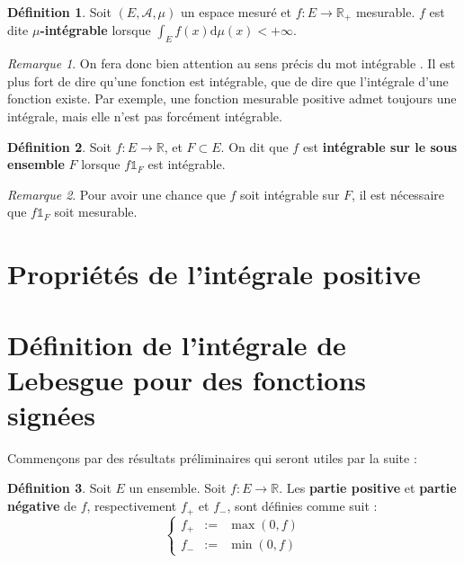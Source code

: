 \documentclass[french]{report}
\theoremstyle{plain}
\theoremstyle{definition}
\newtheorem{defi}{Définition}[section]
\theoremstyle{remark}
\newtheorem{rem}{Remarque}[section]
\begin{document}
\begin{defi}
  Soit $\left(E,\mathcal{A},\mu\right)$ un espace mesuré et $f:E\rightarrow\mathbb{R}_+$ mesurable.
  $f$ est dite $\mu$\textbf{-intégrable} lorsque $\displaystyle\int_Ef(x)\text{d}\mu(x) < +\infty$.
\end{defi}

\begin{rem}
  \label{rem:attint}
  On fera donc bien attention au sens précis du mot \og intégrable \fg.
  Il est plus fort de dire qu'une fonction est intégrable, que de dire que l'intégrale d'une fonction existe.
  Par exemple, une fonction mesurable positive admet toujours une intégrale, mais elle n'est pas forcément intégrable.
\end{rem}

\begin{defi}
  Soit $f:E\longrightarrow\mathbb{R}$, et $F\subset E$.
  On dit que $f$ est \textbf{intégrable sur le sous ensemble} $F$ lorsque $f\mathds{1}_F$ est intégrable.
\end{defi}

\begin{rem}
  Pour avoir une chance que $f$ soit intégrable sur $F$, il est nécessaire que $f\mathds{1}_F$ soit mesurable.
\end{rem}


\section{Propriétés de l'intégrale positive}

\section{Définition de l'intégrale de Lebesgue pour des fonctions signées}

Commençons par des résultats préliminaires qui seront utiles par la suite :

\begin{defi}
  \label{def:partieposneg}
  Soit $E$ un ensemble.
  Soit $f:E\longrightarrow\mathbb{R}$.
  Les \textbf{partie positive} et \textbf{partie négative} de $f$, respectivement $f_+$ et $f_-$, sont définies comme suit :
  $$
  \left\{
    \begin{array}{rcl}
      f_+&:=&\max(0,f)\\
      f_-&:=&\min(0,f)
    \end{array}
  \right.
  $$
\end{defi}
\end{document}

